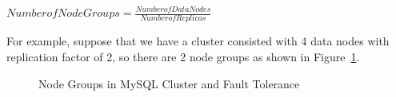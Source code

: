 \begin{center}
	$Number of Node Groups = \frac{Number of Data Nodes}{Number of Replicas}$
\end{center}

\noindent For example, suppose that we have a cluster consisted with 4 data nodes with replication factor of 2, so there are 2 node groups as shown in Figure~\ref{fig:mysqlclusterng}.

\begin{figure}
	\centering     %
	\caption{Node Groups in MySQL Cluster and Fault Tolerance \protect  \cite{mysqlclusterng}}
	\label{fig:mysqlclusterng}
\end{figure}

